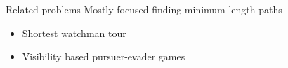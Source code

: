\begin{frame}{Related problems}
	Mostly focused finding minimum length paths
	\begin{itemize}
		\item Shortest watchman tour
		\item Visibility based pursuer-evader games
	\end{itemize}
\end{frame}
